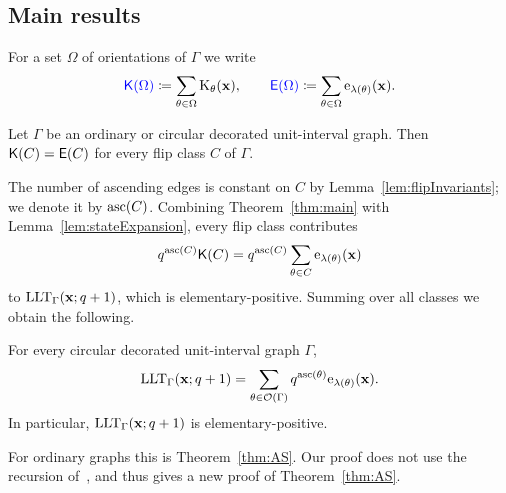 \subsection{Main results}\label{subs:mainResults}

For a set $\Omega$ of orientations of $\Gamma$ we write
\[
 \defin{\Kv(\Omega)}\coloneqq\sum_{\theta\in\Omega}\Kp_{\theta}(\xvec),
 \qquad
 \defin{\Ev(\Omega)}\coloneqq\sum_{\theta\in\Omega}\elementaryE_{\lambda(\theta)}(\xvec).
\]

\begin{theorem}\label{thm:main}
Let $\Gamma$ be an ordinary or circular decorated unit-interval graph.
Then $\mathsf{K}(C)=\mathsf{E}(C)$ for every flip class $C$ of $\Gamma$.
\end{theorem}

The number of ascending edges is constant on $C$ by
Lemma~\ref{lem:flipInvariants}; we denote it by $\operatorname{asc}(C)$.
Combining Theorem~\ref{thm:main} with Lemma~\ref{lem:stateExpansion}, every flip
class contributes
\[
 q^{\operatorname{asc}(C)}\mathsf{K}(C)=q^{\operatorname{asc}(C)}\sum_{\theta\in C}\mathrm{e}_{\lambda(\theta)}(\mathbf{x})
\]
to $\operatorname{LLT}_\Gamma(\mathbf{x};q+1)$, which is elementary-positive.
Summing over all classes we obtain the following.

\begin{corollary}\label{cor:circularExpansion}
For every circular decorated unit-interval graph $\Gamma$,
\[
 \operatorname{LLT}_\Gamma(\mathbf{x};q+1)=\sum_{\theta\in\mathcal{O}(\Gamma)}q^{\operatorname{asc}(\theta)}
 \mathrm{e}_{\lambda(\theta)}(\mathbf{x}).
\]
In particular, $\operatorname{LLT}_\Gamma(\mathbf{x};q+1)$ is elementary-positive.
\end{corollary}

For ordinary graphs this is Theorem~\ref{thm:AS}.
Our proof does not use the recursion of~\cite{AlexanderssonSulzgruber2022}, and
thus gives a new proof of Theorem~\ref{thm:AS}.
